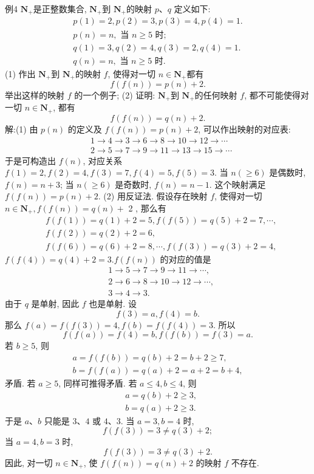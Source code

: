 例4 $\mathbf{N}_{+}$是正整数集合, $\mathbf{N}_{+}$到 $\mathbf{N}_{+}$的映射 $p 、 q$ 定义如下:
$$
\begin{gathered}
p(1)=2, p(2)=3, p(3)=4, p(4)=1 . \\
p(n)=n, \text { 当 } n \geqslant 5 \text { 时; } \\
q(1)=3, q(2)=4, q(3)=2, q(4)=1 . \\
q(n)=n, \text { 当 } n \geqslant 5 \text { 时.
}
\end{gathered}
$$
(1) 作出 $\mathbf{N}_{+}$到 $\mathbf{N}_{+}$的映射 $f$, 使得对一切 $n \in \mathbf{N}_{+}$都有
$$
f(f(n))=p(n)+2 .
$$
举出这样的映射 $f$ 的一个例子;
(2) 证明: $\mathbf{N}_{+}$到 $\mathbf{N}_{+}$的任何映射 $f$, 都不可能使得对一切 $n \in \mathbf{N}_{+}$, 都有
$$
f(f(n))=q(n)+2 .
$$
解:(1) 由 $p(n)$ 的定义及 $f(f(n))=p(n)+2$, 可以作出映射的对应表:
$$
\begin{aligned}
& 1 \rightarrow 4 \rightarrow 3 \rightarrow 6 \rightarrow 8 \rightarrow 10 \rightarrow 12 \rightarrow \cdots \\
& 2 \rightarrow 5 \rightarrow 7 \rightarrow 9 \rightarrow 11 \rightarrow 13 \rightarrow 15 \rightarrow \cdots
\end{aligned}
$$
于是可构造出 $f(n)$, 对应关系 $f(1)=2, f(2)=4, f(3)=7, f(4)=5, f(5)=3$. 当 $n(\geqslant 6)$ 是偶数时, $f(n)=n+3$; 当 $n(\geqslant 6)$ 是奇数时, $f(n)=n-1$. 这个映射满足 $f(f(n))= p(n)+2$.
(2) 用反证法.
假设存在映射 $f$, 使得对一切 $n \in \mathbf{N}_{+}, f(f(n))=q(n)+$ 2 , 那么有
$$
\begin{aligned}
& f(f(1))=q(1)+2=5, f(f(5))=q(5)+2=7, \cdots, \\
& f(f(2))=q(2)+2=6, \\
& f(f(6))=q(6)+2=8, \cdots, f(f(3))=q(3)+2=4,
\end{aligned}
$$
$f(f(4))=q(4)+2=3 . f(f(n))$ 的对应的值是
$$
\begin{aligned}
& 1 \rightarrow 5 \rightarrow 7 \rightarrow 9 \rightarrow 11 \rightarrow \cdots, \\
& 2 \rightarrow 6 \rightarrow 8 \rightarrow 10 \rightarrow 12 \rightarrow \cdots, \\
& 3 \rightarrow 4 \rightarrow 3 .
\end{aligned}
$$
由于 $q$ 是单射, 因此 $f$ 也是单射.
设
$$
f(3)=a, f(4)=b .
$$
那么 $f(a)=f(f(3))=4, f(b)=f(f(4))=3$. 所以
$$
f(f(a))=f(4)=b, f(f(b))=f(3)=a .
$$
若 $b \geqslant 5$, 则
$$
\begin{gathered}
a=f(f(b))=q(b)+2=b+2 \geqslant 7, \\
b=f(f(a))=q(a)+2=a+2=b+4,
\end{gathered}
$$
矛盾.
若 $a \geqslant 5$, 同样可推得矛盾.
若 $a \leqslant 4, b \leqslant 4$, 则
$$
\begin{aligned}
& a=q(b)+2 \geqslant 3, \\
& b=q(a)+2 \geqslant 3 .
\end{aligned}
$$
于是 $a 、 b$ 只能是 $3 、 4$ 或 $4 、 3$.
当 $a=3, b=4$ 时,
$$
f(f(3))=3 \neq q(3)+2 ;
$$
当 $a=4, b=3$ 时,
$$
f(f(3))=3 \neq q(3)+2 .
$$
因此, 对一切 $n \in \mathbf{N}_{+}$, 使 $f(f(n))=q(n)+2$ 的映射 $f$ 不存在.



